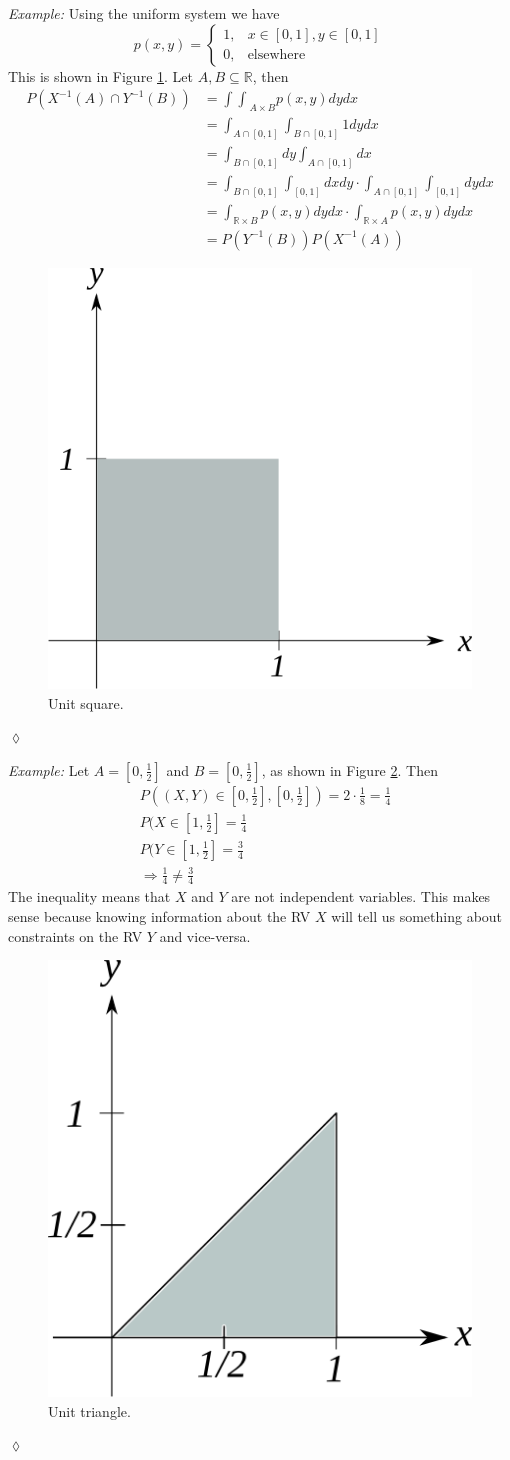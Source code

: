 \documentclass[lecture,12pt,]{pcms-l}
\begin{document}
\textit{Example:} Using the uniform system we have
$$p(x,y) = \begin{cases} 1, & x\in[0,1],y\in[0,1] \\ 0, & \text{elsewhere} \end{cases}$$
This is shown in Figure \ref{fig:02unitSquare}. Let $A,B\subseteq\mathbb{R}$, then
\begin{align*}
P(X^{-1}(A) \cap Y^{-1}(B)) &= {\int\int}_{A\times B} p(x,y)dydx \\
&= \int_{A\cap[0,1]}\int_{B\cap[0,1]} 1 dydx \\
&= \int_{B\cap[0,1]}dy \int_{A\cap[0,1]}dx \\
&= \int_{B\cap[0,1]}\int_{[0,1]}dxdy \cdot \int_{A\cap[0,1]}\int_{[0,1]}dydx \\
&= \int_{\mathbb{R}\times B}p(x,y)dydx \cdot \int_{\mathbb{R}\times A}p(x,y)dydx \\
&= P(Y^{-1}(B)) P(X^{-1}(A))
\end{align*}
\begin{figure}[ht!]
	\centering
	\includegraphics[width=.3\textwidth]{images/02unitSquare}
	\caption{Unit square.}
	\label{fig:02unitSquare}
\end{figure}
$\lozenge$

\textit{Example:} Let $A=[0,\frac{1}{2}]$ and $B=[0,\frac{1}{2}]$, as shown in Figure \ref{fig:02unitTriangle}. Then
\begin{align*}
&P((X,Y)\in [0,\frac{1}{2}],[0,\frac{1}{2}]) = 2\cdot \frac{1}{8} = \frac{1}{4} \\
&P(X\in[1,\frac{1}{2}] = \frac{1}{4} \\
&P(Y\in[1,\frac{1}{2}] = \frac{3}{4} \\
&\Rightarrow \frac{1}{4} \neq \frac{3}{4}
\end{align*}
The inequality means that $X$ and $Y$ are not independent variables. This makes sense because knowing information about the RV $X$ will tell us something about constraints on the RV $Y$ and vice-versa.
\begin{figure}[ht!]
	\centering
	\includegraphics[width=.3\textwidth]{images/02unitTriangle}
	\caption{Unit triangle.}
	\label{fig:02unitTriangle}
\end{figure}
$\lozenge$
\end{document}
